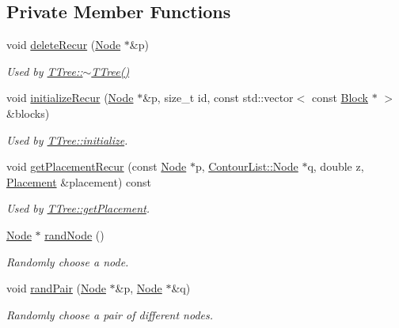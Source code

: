 \subsection*{Private Member Functions}
\begin{DoxyCompactItemize}
\item 
void \hyperlink{classTTree_ae84ee6af5647439489b8d06c05cb2f8e}{delete\+Recur} (\hyperlink{structTTree_1_1Node}{Node} $\ast$\&p)
\begin{DoxyCompactList}\small\item\em Used by \hyperlink{classTTree_a392d80512f4336cdc8f60eee4377e668}{T\+Tree\+::$\sim$\+T\+Tree()} \end{DoxyCompactList}\item 
void \hyperlink{classTTree_aa4a9d2b247a7f9c33d1834fd23de7cca}{initialize\+Recur} (\hyperlink{structTTree_1_1Node}{Node} $\ast$\&p, size\+\_\+t id, const std\+::vector$<$ const \hyperlink{structBlock}{Block} $\ast$ $>$ \&blocks)
\begin{DoxyCompactList}\small\item\em Used by \hyperlink{classTTree_a7be152bf003a3b7a41a0d2f2b8a60dcb}{T\+Tree\+::initialize}. \end{DoxyCompactList}\item 
void \hyperlink{classTTree_a15f3075fa4f2bae22a681a1c2889692c}{get\+Placement\+Recur} (const \hyperlink{structTTree_1_1Node}{Node} $\ast$p, \hyperlink{structContourList_1_1Node}{Contour\+List\+::\+Node} $\ast$q, double z, \hyperlink{classPlacement}{Placement} \&placement) const 
\begin{DoxyCompactList}\small\item\em Used by \hyperlink{classTTree_a7e34e70567be7961d4a5683010746aae}{T\+Tree\+::get\+Placement}. \end{DoxyCompactList}\item 
\hyperlink{structTTree_1_1Node}{Node} $\ast$ \hyperlink{classTTree_acd9ed57c09bb59a5fcf618b8e215d584}{rand\+Node} ()
\begin{DoxyCompactList}\small\item\em Randomly choose a node. \end{DoxyCompactList}\item 
void \hyperlink{classTTree_aa756d0b900bc757b8095993d86fa5bd9}{rand\+Pair} (\hyperlink{structTTree_1_1Node}{Node} $\ast$\&p, \hyperlink{structTTree_1_1Node}{Node} $\ast$\&q)
\begin{DoxyCompactList}\small\item\em Randomly choose a pair of different nodes. \end{DoxyCompactList}\item 

\end{DoxyCompactItemize}
